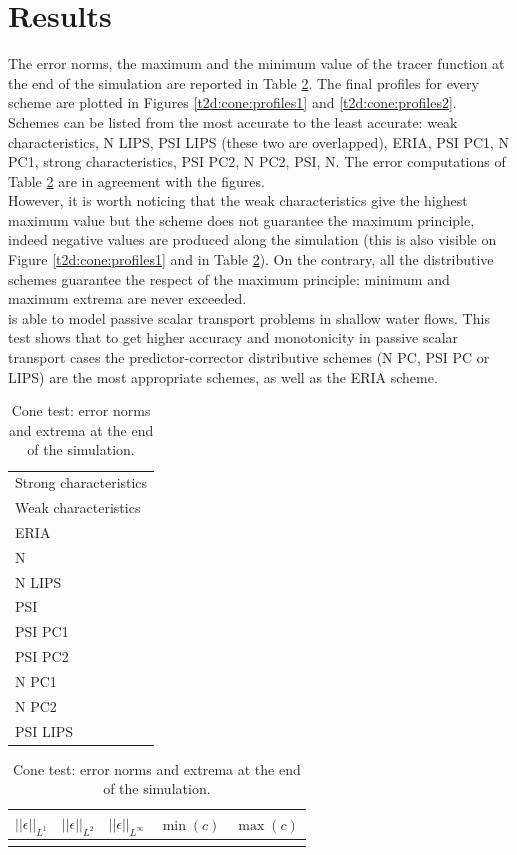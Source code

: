 \section{Results}
The error norms, the maximum and the minimum value of the tracer function at the end of the simulation are reported in Table \ref{t2d:cone:tab1}. The final profiles for every scheme are plotted in Figures \ref{t2d:cone:profiles1} and \ref{t2d:cone:profiles2}. Schemes can be listed from the most accurate to the least accurate: weak characteristics, N LIPS, PSI LIPS (these two are overlapped), ERIA, PSI PC1, N PC1, strong characteristics, PSI PC2, N PC2, PSI, N.
The error computations of Table \ref{t2d:cone:tab1} are in agreement with the figures.\\
However, it is worth noticing that the weak characteristics give the highest maximum value but the scheme does not guarantee the maximum principle, indeed negative values are produced along the simulation (this is also visible on Figure \ref{t2d:cone:profiles1} and in Table \ref{t2d:cone:tab1}). On the contrary, all the distributive schemes guarantee the respect of the maximum principle: minimum and maximum extrema are never exceeded. \\
 is able to model passive scalar transport problems in shallow water flows. This test shows that to get higher accuracy and monotonicity in passive scalar transport cases the predictor-corrector distributive schemes (N PC, PSI PC or LIPS) are the most appropriate schemes, as well as the ERIA scheme.
%
\begin{table}[H]
\centering
\caption{Cone test: error norms and extrema at the end of the simulation.}
\begin{tabular}{l|}
\\ \hline Strong characteristics \\ Weak characteristics \\ ERIA \\ N \\ N LIPS \\ PSI \\ PSI PC1 \\ PSI PC2 \\ N PC1 \\ N PC2 \\ PSI LIPS
\end{tabular}%
\begin{tabular}{|c|c|c|c|c}
  $||\epsilon||_{L^1}$ & $||\epsilon||_{L^2}$ & $||\epsilon||_{L^{\infty}}$ & $\min(c)$ & $\max(c)$\\
\hline

\label{t2d:cone:tab1}
\end{tabular}
\end{table}
